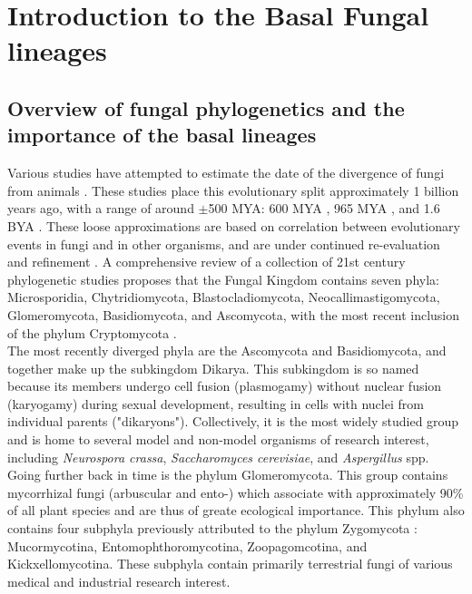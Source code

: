 \chapter{Introduction to the Basal Fungal lineages}
\section{Overview of fungal phylogenetics and the importance of the basal lineages}
Various studies have attempted to estimate the date of the divergence of fungi from animals \cite{Taylor2006}. These studies place this evolutionary split approximately 1 billion years ago, with a range of around $\pm$500 MYA: 600 MYA \cite{Berbee1993}, 965 MYA \cite{Doolittle1996}, and 1.6 BYA \cite{Wang1999}. These loose approximations are based on correlation between evolutionary events in fungi and in other organisms, and are under continued re-evaluation and refinement \cite{Berbee2010}.
\indent A comprehensive review of a collection of 21st century phylogenetic studies \cite{Hibbett2007} proposes that the Fungal Kingdom contains seven phyla: Microsporidia, Chytridiomycota, Blastocladiomycota, Neocallimastigomycota, Glomeromycota, Basidiomycota, and Ascomycota, with the most recent inclusion of the phylum Cryptomycota \cite{Jones2011}.\\
\indent The most recently diverged phyla are the Ascomycota and Basidiomycota, and together make up the subkingdom Dikarya. This subkingdom is so named because its members undergo cell fusion (plasmogamy) without nuclear fusion (karyogamy) during sexual development, resulting in cells with nuclei from individual parents ("dikaryons"). Collectively, it is the most widely studied group and is home to several model and non-model organisms of research interest, including \textit{Neurospora crassa}, \textit{Saccharomyces cerevisiae}, and \textit{Aspergillus} spp.\\
\indent Going further back in time is the phylum Glomeromycota. This group contains mycorrhizal fungi (arbuscular and ento-) which associate with approximately 90\% of all plant species and are thus of greate ecological importance. This phylum also contains four subphyla previously attributed to the phylum Zygomycota \cite{White2006}: Mucormycotina, Entomophthoromycotina, Zoopagomcotina, and Kickxellomycotina. These subphyla contain primarily terrestrial fungi of various medical and industrial research interest.\\ 
